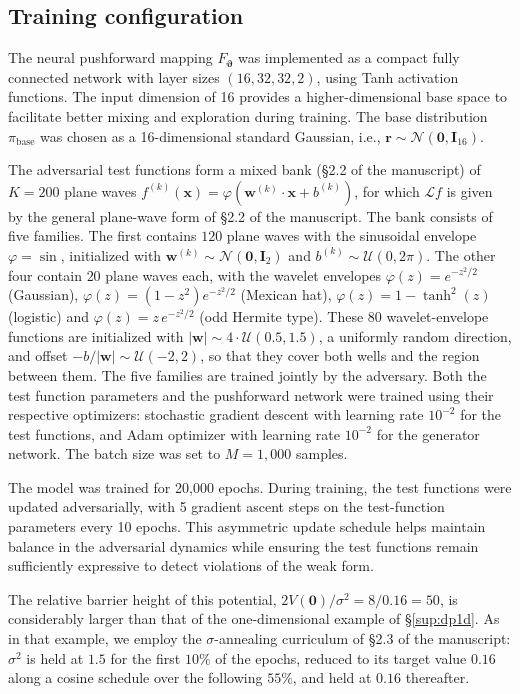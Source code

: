 \documentclass[11pt,a4paper]{article}
\renewcommand{\mathbf}[1]{\boldsymbol{#1}}
\newcommand{\revthree}[1]{\textcolor{revthreecolor}{#1}}
\begin{document}
\subsection{Training configuration}
The neural pushforward mapping $F_{\boldsymbol{\vartheta}}$ was implemented as a compact fully connected network with layer sizes $(16, 32, 32, 2)$, using Tanh activation functions. The input dimension of 16 provides a higher-dimensional base space to facilitate better mixing and exploration during training. The base distribution $\pi_{\text{base}}$ was chosen as a 16-dimensional standard Gaussian, i.e., $\mathbf{r} \sim \mathcal{N}(\mathbf{0}, \mathbf{I}_{16})$.

\revthree{The adversarial test functions form a mixed bank (\S2.2 of the manuscript) of $K=200$ plane waves $f^{(k)}(\mathbf{x}) = \varphi(\mathbf{w}^{(k)} \cdot \mathbf{x} + b^{(k)})$, for which $\mathcal{L}f$ is given by the general plane-wave form of \S2.2 of the manuscript. The bank consists of five families. The first contains $120$ plane waves with the sinusoidal envelope $\varphi = \sin$, initialized with $\mathbf{w}^{(k)} \sim \mathcal{N}(\mathbf{0}, \mathbf{I}_2)$ and $b^{(k)} \sim \mathcal{U}(0, 2\pi)$. The other four contain $20$ plane waves each, with the wavelet envelopes $\varphi(z) = e^{-z^2/2}$ (Gaussian), $\varphi(z) = (1-z^2)e^{-z^2/2}$ (Mexican hat), $\varphi(z) = 1-\tanh^2(z)$ (logistic) and $\varphi(z) = z\,e^{-z^2/2}$ (odd Hermite type). These $80$ wavelet-envelope functions are initialized with $|\mathbf{w}| \sim 4\cdot\mathcal{U}(0.5,1.5)$, a uniformly random direction, and offset $-b/|\mathbf{w}| \sim \mathcal{U}(-2,2)$, so that they cover both wells and the region between them. The five families are trained jointly by the adversary.} Both the test function parameters and the pushforward network were trained using their respective optimizers: stochastic gradient descent with learning rate $10^{-2}$ for the test functions, and Adam optimizer with learning rate $10^{-2}$ for the generator network. The batch size was set to $M=1{,}000$ samples.

The model was trained for \revthree{20,000} epochs. During training, the test functions were updated adversarially, with 5 gradient ascent steps \revthree{on the test-function parameters every 10 epochs}. This asymmetric update schedule helps maintain balance in the adversarial dynamics while ensuring the test functions remain sufficiently expressive to detect violations of the weak form.

\revthree{The relative barrier height of this potential, $2V(\mathbf{0})/\sigma^2 = 8/0.16 = 50$, is considerably larger than that of the one-dimensional example of \S\ref{sup:dp1d}. As in that example, we employ the $\sigma$-annealing curriculum of \S2.3 of the manuscript: $\sigma^2$ is held at $1.5$ for the first $10\%$ of the epochs, reduced to its target value $0.16$ along a cosine schedule over the following $55\%$, and held at $0.16$ thereafter.}
\end{document}
